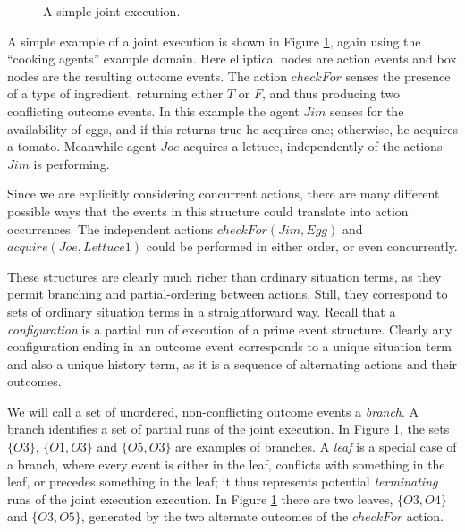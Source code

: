 %
\begin{figure}[!b]

\caption{A simple joint execution.}


\label{fig:example-je} 
\end{figure}


A simple example of a joint execution is shown in Figure \ref{fig:example-je},
again using the {}``cooking agents'' example domain. Here elliptical
nodes are action events and box nodes are the resulting outcome events.
The action $checkFor$ senses the presence of a type of ingredient,
returning either $T$ or $F$, and thus producing two conflicting
outcome events. In this example the agent $Jim$ senses for the availability
of eggs, and if this returns true he acquires one; otherwise, he acquires
a tomato. Meanwhile agent $Joe$ acquires a lettuce, independently
of the actions $Jim$ is performing.

Since we are explicitly considering concurrent actions, there are
many different possible ways that the events in this structure could
translate into action occurrences. The independent actions $checkFor(Jim,Egg)$
and $acquire(Joe,Lettuce1)$ could be performed in either order, or
even concurrently.

These structures are clearly much richer than ordinary situation terms,
as they permit branching and partial-ordering between actions. Still,
they correspond to sets of ordinary situation terms in a straightforward
way. Recall that a \emph{configuration} is a partial run of execution
of a prime event structure. Clearly any configuration ending in an
outcome event corresponds to a unique situation term and also a unique
history term, as it is a sequence of alternating actions and their
outcomes.

We will call a set of unordered, non-conflicting outcome events a
\emph{branch}. A branch identifies a set of partial runs of the joint
execution. In Figure \ref{fig:example-je}, the sets $\{O3\}$, $\{O1,O3\}$
and $\{O5,O3\}$ are examples of branches. A \emph{leaf} is a special
case of a branch, where every event is either in the leaf, conflicts
with something in the leaf, or precedes something in the leaf; it
thus represents potential \emph{terminating} runs of the joint execution
execution. In Figure \ref{fig:example-je} there are two leaves, $\{O3,O4\}$
and $\{O3,O5\}$, generated by the two alternate outcomes of the $checkFor$
action.


